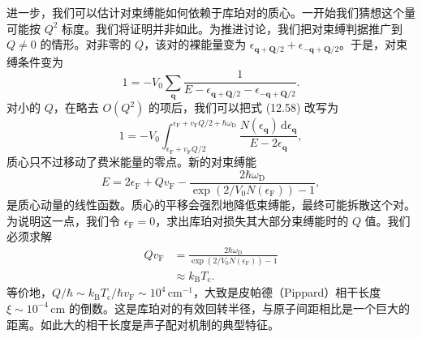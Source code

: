 进一步，我们可以估计对束缚能如何依赖于库珀对的质心。一开始我们猜想这个量可能按 $Q^{2}$ 标度。我们将证明并非如此。为推进讨论，我们把对束缚判据推广到 $Q\neq 0$ 的情形。对非零的 $Q$，该对的裸能量变为 $\epsilon_{\mathbf{q}+\mathbf{Q}/2}+\epsilon_{-\mathbf{q}+\mathbf{Q}/2}$。于是，对束缚条件变为
\begin{equation*}
1=-V_{0}\sum_{\mathbf{q}}\frac{1}{E-\epsilon_{\mathbf{q}+\mathbf{Q}/2}-\epsilon_{-\mathbf{q}+\mathbf{Q}/2}}.\tag{12.58}
\end{equation*}
对小的 $Q$，在略去 $O(Q^{2})$ 的项后，我们可以把式 (12.58) 改写为
\begin{equation*}
1=-V_{0}\int_{\epsilon_{\mathrm{F}}+v_{\mathrm{F}}Q/2}^{\epsilon_{\mathrm{F}}+v_{\mathrm{F}}Q/2+\hbar\omega_{\mathrm{D}}}\frac{N(\epsilon_{\mathbf{q}})\,\mathrm{d}\epsilon_{\mathbf{q}}}{E-2\epsilon_{\mathbf{q}}},\tag{12.59}
\end{equation*}
质心只不过移动了费米能量的零点。新的对束缚能
\begin{equation*}
E=2\epsilon_{\mathrm{F}}+Qv_{\mathrm{F}}-\frac{2\hbar\omega_{\mathrm{D}}}{\exp\left(2/V_{0}N(\epsilon_{\mathrm{F}})\right)-1},\tag{12.60}
\end{equation*}
是质心动量的线性函数。质心的平移会强烈地降低束缚能，最终可能拆散这个对。为说明这一点，我们令 $\epsilon_{\mathrm{F}}=0$，求出库珀对损失其大部分束缚能时的 $Q$ 值。我们必须求解
\begin{align*}
Qv_{\mathrm{F}}&=\frac{2\hbar\omega_{\mathrm{D}}}{\exp\left(2/V_{0}N(\epsilon_{\mathrm{F}})\right)-1}\\
&\approx k_{\mathrm{B}}T_{\mathrm{c}}.\tag{12.61}
\end{align*}
等价地，$Q/\hbar\sim k_{\mathrm{B}}T_{\mathrm{c}}/\hbar v_{\mathrm{F}}\sim 10^{4}\,\mathrm{cm}^{-1}$，大致是皮帕德（Pippard）相干长度 $\xi\sim 10^{-4}\,\mathrm{cm}$ 的倒数。这是库珀对的有效回转半径，与原子间距相比是一个巨大的距离。如此大的相干长度是声子配对机制的典型特征。
